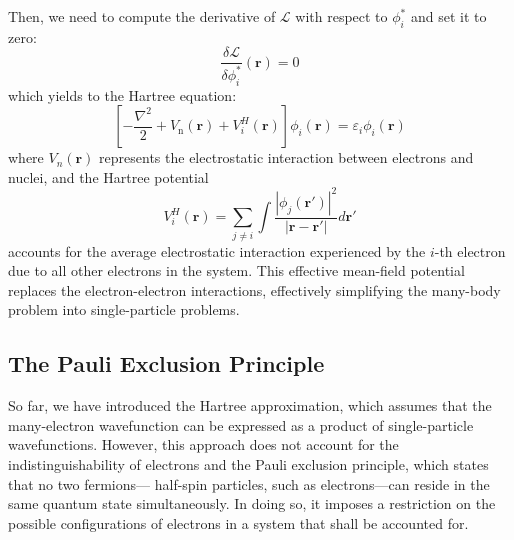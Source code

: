Then, we need to compute the derivative of $\mathcal{L}$ with respect to $\phi_i^*$ and set it to zero:
\begin{equation}
  \label{eq26}
  \frac{\delta \mathcal{L}}{\delta \phi_i^*}(\mathbf{r}) = 0
\end{equation}
which yields to the Hartree equation:
\begin{equation}
  \label{eq27}
  \left[-\frac{\nabla^2}{2} + V_{\text{n}}(\mathbf{r}) + V^H_i(\mathbf{r})\right]\phi_i(\mathbf{r})  = \varepsilon_i \phi_i(\mathbf{r})
\end{equation}
where $V_n(\mathbf{r})$ represents the electrostatic interaction between electrons and nuclei, and the Hartree potential 
\begin{equation}
  \label{eq28}
  V^H_i(\mathbf{r}) = \sum_{j\neq i} \int \frac{|\phi_j(\mathbf{r'})|^2}{|\mathbf{r} - \mathbf{r'}|} d\mathbf{r'}
\end{equation}
accounts for the average electrostatic interaction experienced by the $i$-th electron due to all other electrons in the system. This effective mean-field potential replaces the electron-electron interactions, effectively simplifying the many-body problem into single-particle problems. 
\subsection{The Pauli Exclusion Principle}
So far, we have introduced the Hartree approximation, which assumes that the many-electron wavefunction can be expressed as a product of single-particle wavefunctions. However, this approach does not account for the indistinguishability of electrons and the Pauli exclusion principle, which states that no two fermions--- half-spin particles, such as electrons---can reside in the same quantum state simultaneously. In doing so, it imposes a restriction on the possible configurations of electrons in a system that shall be accounted for.
 

